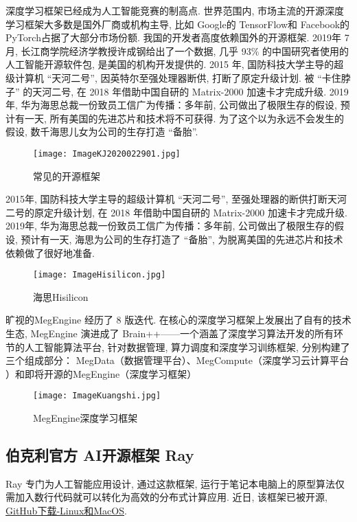 深度学习框架已经成为人工智能竞赛的制高点. 世界范围内, 市场主流的开源深度学习框架大多数是国外厂商或机构主导, 比如 Google的 TensorFlow和 Facebook的 PyTorch占据了大部分市场份额.
我国的开发者高度依赖国外的开源框架. 2019年 7月, 长江商学院经济学教授许成钢给出了一个数据, 几乎 93\% 的中国研究者使用的人工智能开源软件包, 是美国的机构开发提供的.
2015 年, 国防科技大学主导的超级计算机 “天河二号”, 因英特尔至强处理器断供, 打断了原定升级计划. 被 “卡住脖子” 的天河二号, 在 2018 年借助中国自研的 Matrix-2000 加速卡才完成升级.
2019 年, 华为海思总裁一份致员工信广为传播：多年前, 公司做出了极限生存的假设, 预计有一天, 所有美国的先进芯片和技术将不可获得. 为了这个以为永远不会发生的假设, 数千海思儿女为公司的生存打造 “备胎”.
\begin{figure}[H]
\centering
\texttt{[image: ImageKJ2020022901.jpg]}
\caption{常见的开源框架}
\label{VSstudio2019CNTK013001}
\end{figure}
2015年, 国防科技大学主导的超级计算机 “天河二号”, 至强处理器的断供打断天河二号的原定升级计划, 在 2018 年借助中国自研的 Matrix-2000 加速卡才完成升级.
2019年, 华为海思总裁一份致员工信广为传播：多年前, 公司做出了极限生存的假设, 预计有一天, 海思为公司的生存打造了 “备胎”, 为脱离美国的先进芯片和技术依赖做了很好地准备.
\begin{figure}[H]
\centering
\texttt{[image: ImageHisilicon.jpg]}
\caption{海思Hisilicon}
\label{ImageHisilicon2020001}
\end{figure}
旷视的MegEngine 经历了 8 版迭代. 在核心的深度学习框架上发展出了自有的技术生态, MegEngine 演进成了 Brain++——一个涵盖了深度学习算法开发的所有环节的人工智能算法平台, 针对数据管理, 算力调度和深度学习训练框架, 分别构建了三个组成部分： MegData（数据管理平台）、MegCompute（深度学习云计算平台 ）和即将开源的MegEngine（深度学习框架）
\begin{figure}[H]
\centering
\texttt{[image: ImageKuangshi.jpg]}
\caption{MegEngine深度学习框架}
\label{ImageKuangshi2020001}
\end{figure}
\subsection{伯克利官方 AI开源框架 Ray}
Ray 专门为人工智能应用设计, 通过这款框架, 运行于笔记本电脑上的原型算法仅需加入数行代码就可以转化为高效的分布式计算应用. 近日, 该框架已被开源, \href{https://github.com/ray-project/ray}{GitHub下载-Linux和MacOS}.


